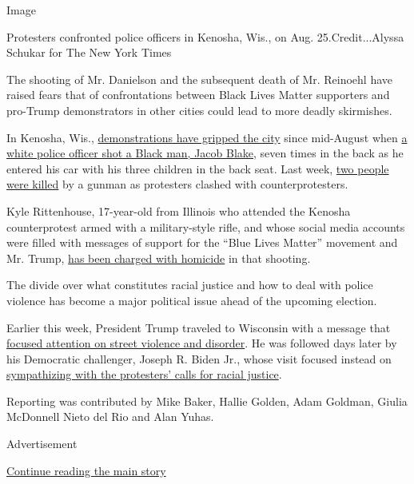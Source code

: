 Image

Protesters confronted police officers in Kenosha, Wis., on Aug.
25.Credit...Alyssa Schukar for The New York Times

The shooting of Mr. Danielson and the subsequent death of Mr. Reinoehl
have raised fears that of confrontations between Black Lives Matter
supporters and pro-Trump demonstrators in other cities could lead to
more deadly skirmishes.

In Kenosha, Wis.,
\href{https://www.nytimes3xbfgragh.onion/2020/08/24/us/kenosha-police-shooting.html}{demonstrations
have gripped the city} since mid-August when
\href{https://www.nytimes3xbfgragh.onion/2020/08/23/us/kenosha-police-shooting.html}{a
white police officer shot a Black man, Jacob Blake}, seven times in the
back as he entered his car with his three children in the back seat.
Last week,
\href{https://www.nytimes3xbfgragh.onion/2020/08/26/us/kenosha-shooting-protests-jacob-blake.html}{two
people were killed} by a gunman as protesters clashed with
counterprotesters.

Kyle Rittenhouse, 17-year-old from Illinois who attended the Kenosha
counterprotest armed with a military-style rifle, and whose social media
accounts were filled with messages of support for the ``Blue Lives
Matter'' movement and Mr. Trump,
\href{https://www.nytimes3xbfgragh.onion/2020/08/27/us/kyle-rittenhouse-kenosha.html}{has
been charged with homicide} in that shooting.

The divide over what constitutes racial justice and how to deal with
police violence has become a major political issue ahead of the upcoming
election.

Earlier this week, President Trump traveled to Wisconsin with a message
that
\href{https://www.nytimes3xbfgragh.onion/live/2020/09/01/us/trump-vs-biden\#trump-is-greeted-by-protesters-and-supporters-as-he-visits-wisconsin}{focused
attention on street violence and disorder}. He was followed days later
by his Democratic challenger, Joseph R. Biden Jr., whose visit focused
instead on
\href{https://www.nytimes3xbfgragh.onion/2020/09/03/us/politics/joe-biden-kenosha.html}{sympathizing
with the protesters' calls for racial justice}.

Reporting was contributed by Mike Baker, Hallie Golden, Adam Goldman,
Giulia McDonnell Nieto del Rio and Alan Yuhas.

Advertisement

\protect\hyperlink{after-bottom}{Continue reading the main story}


